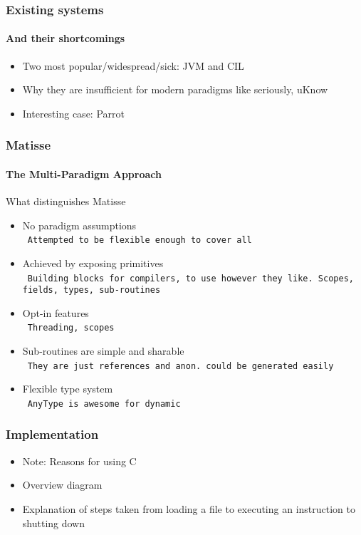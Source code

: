 \documentclass[handout]{beamer}
\newcommand{\n}[1]{\\~\texttt{\color{red}\tiny #1}}
\begin{document}
\begin{frame}
  \frametitle{Existing systems}
  \framesubtitle{And their shortcomings}

  \begin{itemize}
  \item Two most popular/widespread/sick: JVM and CIL
  \item Why they are insufficient for modern paradigms like seriously, uKnow
  \item Interesting case: Parrot
  \end{itemize}
\end{frame}

\begin{frame}
  \frametitle{Matisse}
  \framesubtitle{The Multi-Paradigm Approach}

  What distinguishes Matisse
  \begin{itemize}
  \item No paradigm assumptions
    \n{Attempted to be flexible enough to cover all}
  \item Achieved by exposing primitives
    \n{Building blocks for compilers, to use however they like. Scopes, fields, types, sub-routines}
  \item Opt-in features
    \n{Threading, scopes}
  \item Sub-routines are simple and sharable
    \n{They are just references and anon. could be generated easily}
  \item Flexible type system
    \n{AnyType is awesome for dynamic}
  \end{itemize}
\end{frame}

\begin{frame}
  \frametitle{Implementation}

  \begin{itemize}
  \item Note: Reasons for using C
  \item Overview diagram
  \item Explanation of steps taken from loading a file to executing an
    instruction to shutting down
  \end{itemize}
\end{frame}
\end{document}
